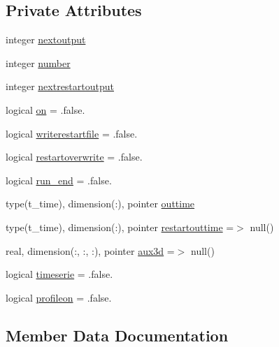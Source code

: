 \subsection*{Private Attributes}
\begin{DoxyCompactItemize}
\item 
integer \mbox{\hyperlink{structmodulefreeverticalmovement_1_1t__output_ad2e231877d1695a5a1b33ff73eac5e38}{nextoutput}}
\item 
integer \mbox{\hyperlink{structmodulefreeverticalmovement_1_1t__output_af2586697f07105bbfc872ef53c885036}{number}}
\item 
integer \mbox{\hyperlink{structmodulefreeverticalmovement_1_1t__output_a458c237dae71728ed9a76a43c0c4f637}{nextrestartoutput}}
\item 
logical \mbox{\hyperlink{structmodulefreeverticalmovement_1_1t__output_a8d48f194a15f6f4bcf72aba2f0a6cba5}{on}} = .false.
\item 
logical \mbox{\hyperlink{structmodulefreeverticalmovement_1_1t__output_a5706956f197c5f906eb6e490b6af3004}{writerestartfile}} = .false.
\item 
logical \mbox{\hyperlink{structmodulefreeverticalmovement_1_1t__output_a5c0bb6fd8a7e30d63d393645e343b8e9}{restartoverwrite}} = .false.
\item 
logical \mbox{\hyperlink{structmodulefreeverticalmovement_1_1t__output_af0623b1f5da0329180eaf493538bdae9}{run\+\_\+end}} = .false.
\item 
type(t\+\_\+time), dimension(\+:), pointer \mbox{\hyperlink{structmodulefreeverticalmovement_1_1t__output_ab1f07d18cd651f04afd936b6548fa1dd}{outtime}}
\item 
type(t\+\_\+time), dimension(\+:), pointer \mbox{\hyperlink{structmodulefreeverticalmovement_1_1t__output_a0bfde2c162dbaf723e451f1c411e83ae}{restartouttime}} =$>$ null()
\item 
real, dimension(\+:, \+:, \+:), pointer \mbox{\hyperlink{structmodulefreeverticalmovement_1_1t__output_a3149ee1c8bcbe89fec6c3c6ddcd316b1}{aux3d}} =$>$ null()
\item 
logical \mbox{\hyperlink{structmodulefreeverticalmovement_1_1t__output_ae0d0f569030040b87ea4e5b6692c4208}{timeserie}} = .false.
\item 
logical \mbox{\hyperlink{structmodulefreeverticalmovement_1_1t__output_aee7e8f3fc8b3c83a47d6d2cc3e4b00b2}{profileon}} = .false.
\end{DoxyCompactItemize}


\subsection{Member Data Documentation}
\mbox{\label{structmodulefreeverticalmovement_1_1t__output_a3149ee1c8bcbe89fec6c3c6ddcd316b1}} 
